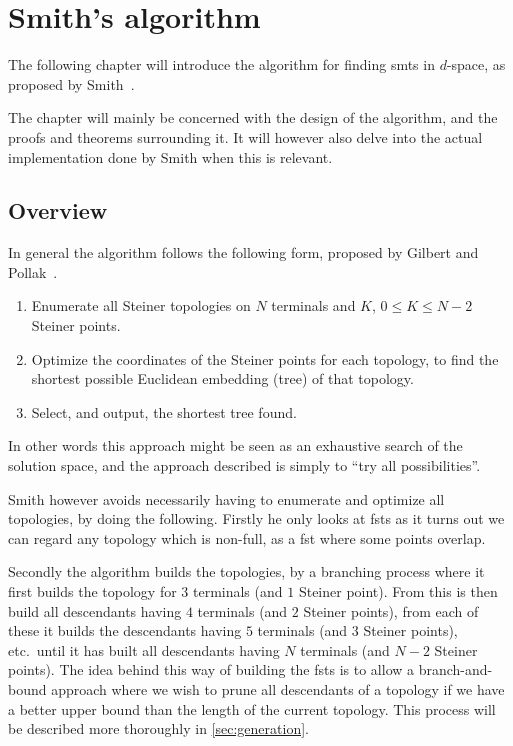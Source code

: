 { \abnormalparskip{0pt}
\chapter{Smith's algorithm}
\label{cha:algorithm} }


The following chapter will introduce the algorithm for finding \glspl{smt} in
$d$-space, as proposed by Smith~\cite{smith1992}.

The chapter will mainly be concerned with the design of the algorithm, and the
proofs and theorems surrounding it. It will however also delve into the actual
implementation done by Smith when this is relevant.

\section{Overview}
\label{sec:overview}

In general the algorithm follows the following form, proposed by Gilbert and
Pollak~\cite{gilbert1968}.

\begin{enumerate}
\item Enumerate all Steiner topologies on $N$ terminals and $K$, $0 \le K \le
N-2$ Steiner points.
\item Optimize the coordinates of the Steiner points for each topology, to find
the shortest possible Euclidean embedding (tree) of that topology.
\item Select, and output, the shortest tree found.
\end{enumerate}

In other words this approach might be seen as an exhaustive search of the
solution space, and the approach described is simply to ``try all
possibilities''.

Smith however avoids necessarily having to enumerate and optimize all
topologies, by doing the following. Firstly he only looks at \glspl{fst} as it
turns out we can regard any topology which is non-full, as a \gls{fst} where
some points overlap.

Secondly the algorithm builds the topologies, by a branching process where it
first builds the topology for $3$ terminals (and $1$ Steiner point). From this
is then build all descendants having $4$ terminals (and $2$ Steiner points),
from each of these it builds the descendants having $5$ terminals (and $3$
Steiner points), etc.\ until it has built all descendants having $N$ terminals
(and $N-2$ Steiner points). The idea behind this way of building the
\glspl{fst} is to allow a branch-and-bound approach where we wish to prune all
descendants of a topology if we have a better upper bound than the length of the
current topology. This process will be described more thoroughly in
\cref{sec:generation}.

